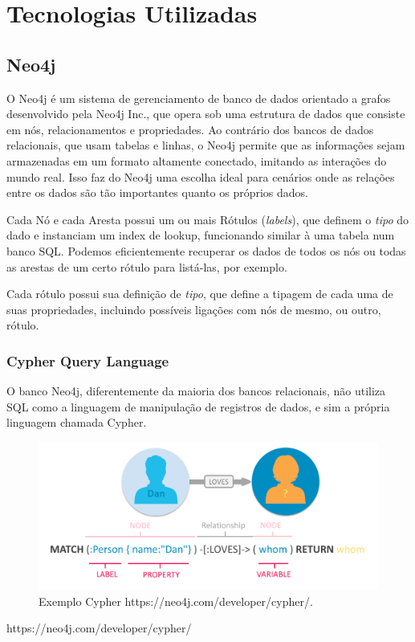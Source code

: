 \chapter{Tecnologias Utilizadas}
\label{chap3}

\section{Neo4j}
O Neo4j é um sistema de gerenciamento de banco de dados orientado a grafos desenvolvido pela Neo4j Inc., que opera sob uma estrutura de dados que consiste em nós, relacionamentos e propriedades. Ao contrário dos bancos de dados relacionais, que usam tabelas e linhas, o Neo4j permite que as informações sejam armazenadas em um formato altamente conectado, imitando as interações do mundo real. Isso faz do Neo4j uma escolha ideal para cenários onde as relações entre os dados são tão importantes quanto os próprios dados.

 
Cada Nó e cada Aresta possui um ou mais Rótulos (\textit{labels}), que definem o \textit{tipo} do dado e instanciam um index de lookup, funcionando similar à uma tabela num banco SQL. Podemos eficientemente recuperar os dados de todos os nós ou todas as arestas de um certo rótulo para listá-las, por exemplo.

Cada rótulo possui sua definição de \textit{tipo}, que define a tipagem de cada uma de suas propriedades, incluindo possíveis ligações com nós de mesmo, ou outro, rótulo.

\subsection{Cypher Query Language}

O banco Neo4j, diferentemente da maioria dos bancos relacionais, não utiliza SQL como a linguagem de manipulação de registros de dados, e sim a própria linguagem chamada Cypher.

\begin{figure}[H]
    \centering
    \includegraphics[width=1.0\linewidth]{Imagens/chap03/cypher-exemple.png}
    \caption{Exemplo Cypher https://neo4j.com/developer/cypher/.}
    \label{fig:profile-exemple}
\end{figure}
https://neo4j.com/developer/cypher/

